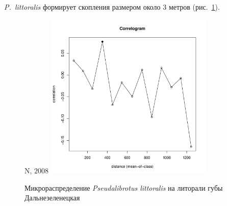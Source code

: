 \documentclass[12pt, a4paper]{disser}
\begin{document}
{\it P.~littoralis} формирует скопления размером около $3$ метров (рис.~\ref{ris:moransI_Plyazh_Pseudalibrotus}).

	\begin{figure}[h]
	\begin{minipage}[b]{.5\linewidth}
	\begin{center}
	{\small N, $2008$}
		\includegraphics[width=80mm]{../Barenc_Sea/distribution_Moran/Plyazh0812_moran_N_Pseudolibrotus_littoralis_.pdf}
	\end{center}
	\end{minipage}

	\caption{Микрораспределение {\it Pseudalibrotus littoralis} на литорали губы Дальнезеленецкая}
	\label{ris:moransI_Plyazh_Pseudalibrotus}
	\end{figure}
\end{document}
